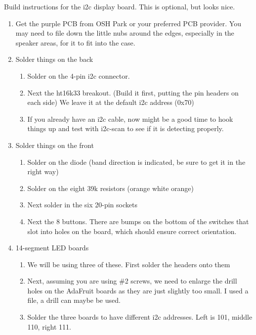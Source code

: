 \documentclass[11pt]{article}
\begin{document}
Build instructions for the i2c display board.
This is optional, but looks nice.


\begin{enumerate}
\item	Get the purple PCB from OSH Park or your preferred PCB provider.
	You may need to file down the little nubs around the edges, especially in the 
	speaker areas, for it to fit into the case.

\item Solder things on the back
	\begin{enumerate}
		\item	Solder on the 4-pin i2c connector.
		\item	Next the ht16k33 breakout.  (Build it first, putting the pin
			headers on each side)  We leave it at the default i2c address (0x70)
		\item	If you already have an i2c cable, now might be a good time to hook 
			things up and test with i2c-scan to see if it is detecting properly.
	\end{enumerate}

\item Solder things on the front
	\begin{enumerate}
	\item	Solder on the diode (band direction is indicated, be sure to get it in
		the right way)
	\item	Solder on the eight 39k resistors (orange white orange)
	\item	Next solder in the six 20-pin sockets
	\item	Next the 8 buttons.
		There are bumps on the bottom of the
		switches that slot into holes on the board, which should
		ensure correct orientation.
	\end{enumerate}

\item 14-segment LED boards

	\begin{enumerate}

		\item	We will be using three of these.
			First solder the headers onto them

		\item  Next, assuming you are using \#2 screws, we need to enlarge the
			drill holes on the AdaFruit boards as they are just slightly too
			small.  I used a file, a drill can maybe be used.

		\item Solder the three boards to have different i2c addresses.
			Left is 101, middle 110, right 111.


\end{enumerate}
\end{enumerate}
\end{document}
